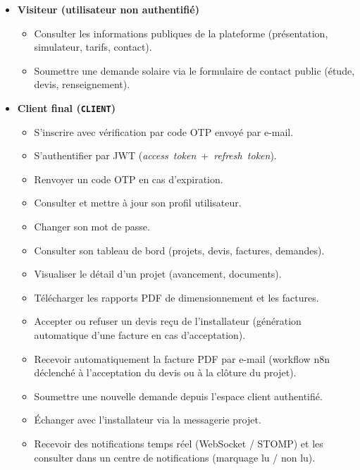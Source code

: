 \begin{itemize}[leftmargin=1.6em, label={$\bullet$}]

  \item \textbf{Visiteur (utilisateur non authentifié)}
  \begin{itemize}[leftmargin=2em, label={--}]
    \item Consulter les informations publiques de la plateforme (présentation,
      simulateur, tarifs, contact).
    \item Soumettre une demande solaire via le formulaire de contact public
      (étude, devis, renseignement).
  \end{itemize}

  \item \textbf{Client final (\texttt{CLIENT})}
  \begin{itemize}[leftmargin=2em, label={--}]
    \item S'inscrire avec vérification par code OTP envoyé par e-mail.
    \item S'authentifier par JWT (\textit{access~token}~+~\textit{refresh~token}).
    \item Renvoyer un code OTP en cas d'expiration.
    \item Consulter et mettre à jour son profil utilisateur.
    \item Changer son mot de passe.
    \item Consulter son tableau de bord (projets, devis, factures, demandes).
    \item Visualiser le détail d'un projet (avancement, documents).
    \item Télécharger les rapports PDF de dimensionnement et les factures.
    \item Accepter ou refuser un devis reçu de l'installateur (génération
      automatique d'une facture en cas d'acceptation).
    \item Recevoir automatiquement la facture PDF par e-mail (workflow n8n
      déclenché à l'acceptation du devis ou à la clôture du projet).
    \item Soumettre une nouvelle demande depuis l'espace client authentifié.
    \item Échanger avec l'installateur via la messagerie projet.
    \item Recevoir des notifications temps réel (WebSocket / STOMP) et les
      consulter dans un centre de notifications (marquage lu / non lu).
  \end{itemize}


\end{itemize}
